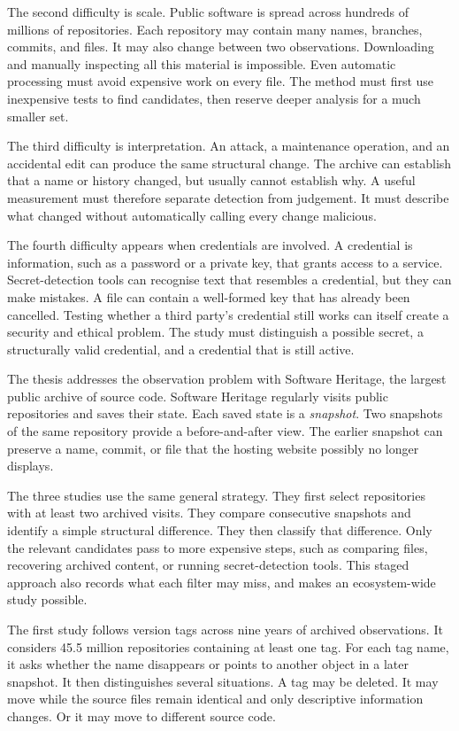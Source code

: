 \begin{SingleSpace}
The second difficulty is scale.
Public software is spread across hundreds of millions of repositories.
Each repository may contain many names, branches, commits, and files.
It may also change between two observations.
Downloading and manually inspecting all this material is impossible.
Even automatic processing must avoid expensive work on every file.
The method must first use inexpensive tests to find candidates, then reserve deeper analysis for a much smaller set.

The third difficulty is interpretation.
An attack, a maintenance operation, and an accidental edit can produce the same structural change.
The archive can establish that a name or history changed, but usually cannot establish why.
A useful measurement must therefore separate detection from judgement.
It must describe what changed without automatically calling every change malicious.

The fourth difficulty appears when credentials are involved.
A credential is information, such as a password or a private key, that grants access to a service.
Secret-detection tools can recognise text that resembles a credential, but they can make mistakes.
A file can contain a well-formed key that has already been cancelled.
Testing whether a third party's credential still works can itself create a security and ethical problem.
The study must distinguish a possible secret, a structurally valid credential, and a credential that is still active.

The thesis addresses the observation problem with Software Heritage, the largest public archive of source code.
Software Heritage regularly visits public repositories and saves their state.
Each saved state is a \emph{snapshot}.
Two snapshots of the same repository provide a before-and-after view.
The earlier snapshot can preserve a name, commit, or file that the hosting website possibly no longer displays.

The three studies use the same general strategy.
They first select repositories with at least two archived visits.
They compare consecutive snapshots and identify a simple structural difference.
They then classify that difference.
Only the relevant candidates pass to more expensive steps, such as comparing files, recovering archived content, or running secret-detection tools.
This staged approach also records what each filter may miss, and makes an ecosystem-wide study possible.

The first study follows version tags across nine years of archived observations.
It considers \num{45.5} million repositories containing at least one tag.
For each tag name, it asks whether the name disappears or points to another object in a later snapshot.
It then distinguishes several situations.
A tag may be deleted.
It may move while the source files remain identical and only descriptive information changes.
Or it may move to different source code.


\end{SingleSpace}
